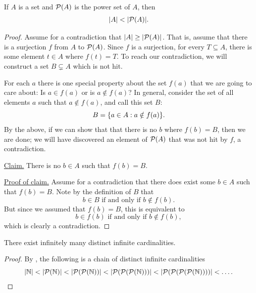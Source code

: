 \documentclass[11pt,twoside=off,numbers=noenddot]{scrbook}
\begin{document}
\begin{theorem}
    If $A$ is a set and $\mathcal{P}(A)$ is the power set of $A$, then
    \begin{align*}
        | A | < | \mathcal{P}(A) |.
    \end{align*}
\end{theorem}

\begin{proof}
    Assume for a contradiction that $| A | \geq | \mathcal{P}(A) |$. That is, assume that there is a surjection $f$ from $A$ to $\mathcal{P}(A)$. Since $f$ is a surjection, for every $T \subseteq A$, there is some element $t \in A$ where $f(t) = T$. To reach our contradiction, we will construct a set $B \subsetneq A$ which is not hit.

    For each $a$ there is one special property about the set $f(a)$ that we are going to care about: Is $a \in f(a)$ or is $a \notin f(a)$? In general, consider the set of all elements $a$ such that $a \notin f(a)$, and call this set $B$:
    \[ B = \{ a \in A : a \notin f(a) \}. \]
    By the above, if we can show that that there is no $b$ where $f(b) = B$, then we are done; we will have discovered an element of $\mathcal{P}(A)$ that was not hit by $f$, a contradiction.

    \underline{Claim.} There is no $b \in A$ such that $f(b) = B$.

    \underline{Proof of claim.} Assume for a contradiction that there does exist some $b \in A$ such that $f(b) = B$. Note by the definition of $B$ that
    \[ \text{$b \in B$ if and only if $b \notin f(b)$}. \]
    But since we assumed that $f(b) = B$, this is equivalent to
    \[ \text{$b \in f(b)$ if and only if $b \notin f(b)$}, \]
    which is clearly a contradiction.
\end{proof}

\begin{corollary}
    There exist infinitely many distinct infinite cardinalities.
\end{corollary}

\begin{proof}
    By , the following is a chain of distinct infinite cardinalities
    \[ | \mathbb N | < | \mathcal{P}(\mathbb N) | < | \mathcal{P}(\mathcal{P}(\mathbb N)) | < | \mathcal{P}(\mathcal{P}(\mathcal{P}(\mathbb N))) | < | \mathcal{P}(\mathcal{P}(\mathcal{P}(\mathcal{P}(\mathbb N)))) | < \dots.\]
\end{proof}
\end{document}
